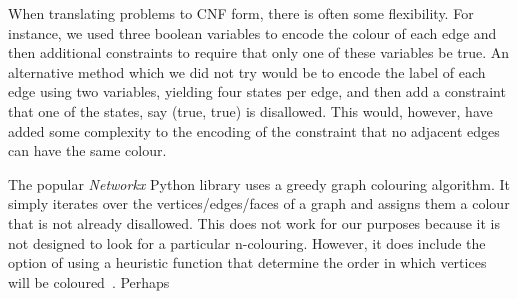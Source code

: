 When translating problems to CNF form, there is often some flexibility. For instance, we used three boolean variables to encode the colour of each edge and then additional constraints to require that only one of these variables be true. An alternative method which we did not try would be to encode the label of each edge using two variables, yielding four states per edge, and then add a constraint that one of the states, say (true, true) is disallowed. This would, however, have added some complexity to the encoding of the constraint that no adjacent edges can have the same colour.

The popular \emph{Networkx} Python library uses a greedy graph colouring algorithm. It simply iterates over the vertices/edges/faces of a graph and assigns them a colour that is not already disallowed. This does not work for our purposes because it is not designed to look for a particular n-colouring. However, it does include the option of using a heuristic function that determine the order in which vertices will be coloured~\autocite{kosowski2004classical,matulaSmallestlastOrderingClustering1983}. Perhaps
